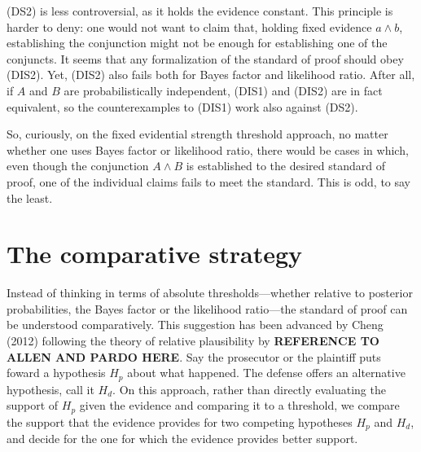 \documentclass[
  10pt,
  dvipsnames,enabledeprecatedfontcommands]{scrartcl}
\newcommand{\et}{\wedge}
\begin{document}
(DS2) is less controversial, as it holds the evidence constant. This
principle is harder to deny: one would not want to claim that, holding
fixed evidence \(a\wedge b\), establishing the conjunction might not be
enough for establishing one of the conjuncts. It seems that any
formalization of the standard of proof should obey (DIS2). Yet, (DIS2)
also fails both for Bayes factor and likelihood ratio. After all, if
\(A\) and \(B\) are probabilistically independent, (DIS1) and (DIS2) are
in fact equivalent, so the counterexamples to (DIS1) work also against
(DS2).

So, curiously, on the fixed evidential strength threshold approach, no
matter whether one uses Bayes factor or likelihood ratio, there would be
cases in which, even though the conjunction \(A\et B\) is established to
the desired standard of proof, one of the individual claims fails to
meet the standard. This is odd, to say the least.



\hypertarget{the-comparative-strategy}{%
\section{The comparative strategy}\label{the-comparative-strategy}}

Instead of thinking in terms of absolute thresholds---whether relative
to posterior probabilities, the Bayes factor or the likelihood
ratio---the standard of proof can be understood comparatively. This
suggestion has been advanced by Cheng (2012) following the theory of
relative plausibility by
\textbf{REFERENCE TO ALLEN AND PARDO HERE}. Say the
prosecutor or the plaintiff puts foward a hypothesis \(H_p\) about what
happened. The defense offers an alternative hypothesis, call it \(H_d\).
On this approach, rather than directly evaluating the support of \(H_p\)
given the evidence and comparing it to a threshold, we compare the
support that the evidence provides for two competing hypotheses \(H_p\)
and \(H_d\), and decide for the one for which the evidence provides
better support.
\end{document}
